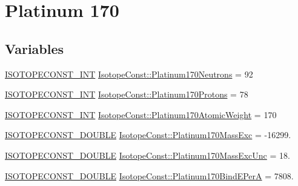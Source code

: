 \hypertarget{group___isotope_const-_platinum-_pt170}{}\section{Platinum 170}
\label{group___isotope_const-_platinum-_pt170}
\subsection*{Variables}
\begin{DoxyCompactItemize}
\item 
\mbox{\hyperlink{group___isotope_const-_macros_ga5f18360b3e99483a35c32d789e62621c}{I\+S\+O\+T\+O\+P\+E\+C\+O\+N\+S\+T\+\_\+\+I\+NT}} \mbox{\hyperlink{group___isotope_const-_platinum-_pt170_gab9f95ad3ecddb655bff523ab49f9ce59}{Isotope\+Const\+::\+Platinum170\+Neutrons}} = 92
\item 
\mbox{\hyperlink{group___isotope_const-_macros_ga5f18360b3e99483a35c32d789e62621c}{I\+S\+O\+T\+O\+P\+E\+C\+O\+N\+S\+T\+\_\+\+I\+NT}} \mbox{\hyperlink{group___isotope_const-_platinum-_pt170_ga7e3b662020f87e183e4a2740183ce2a8}{Isotope\+Const\+::\+Platinum170\+Protons}} = 78
\item 
\mbox{\hyperlink{group___isotope_const-_macros_ga5f18360b3e99483a35c32d789e62621c}{I\+S\+O\+T\+O\+P\+E\+C\+O\+N\+S\+T\+\_\+\+I\+NT}} \mbox{\hyperlink{group___isotope_const-_platinum-_pt170_gaa795946cca84a0d52cf228afeca96acc}{Isotope\+Const\+::\+Platinum170\+Atomic\+Weight}} = 170
\item 
\mbox{\hyperlink{group___isotope_const-_macros_ga8f45a7272ce02c0b4c65c44636ed719a}{I\+S\+O\+T\+O\+P\+E\+C\+O\+N\+S\+T\+\_\+\+D\+O\+U\+B\+LE}} \mbox{\hyperlink{group___isotope_const-_platinum-_pt170_ga387a73e697b3529832a3a5aefbba6c31}{Isotope\+Const\+::\+Platinum170\+Mass\+Exc}} = -\/16299.
\item 
\mbox{\hyperlink{group___isotope_const-_macros_ga8f45a7272ce02c0b4c65c44636ed719a}{I\+S\+O\+T\+O\+P\+E\+C\+O\+N\+S\+T\+\_\+\+D\+O\+U\+B\+LE}} \mbox{\hyperlink{group___isotope_const-_platinum-_pt170_gac7a87927344b81757c54fe0cf9bcbc0a}{Isotope\+Const\+::\+Platinum170\+Mass\+Exc\+Unc}} = 18.
\item 
\mbox{\hyperlink{group___isotope_const-_macros_ga8f45a7272ce02c0b4c65c44636ed719a}{I\+S\+O\+T\+O\+P\+E\+C\+O\+N\+S\+T\+\_\+\+D\+O\+U\+B\+LE}} \mbox{\hyperlink{group___isotope_const-_platinum-_pt170_ga1f2c051da3d667b7e511c862a6407816}{Isotope\+Const\+::\+Platinum170\+Bind\+E\+PerA}} = 7808.
\item 

\end{DoxyCompactItemize}
